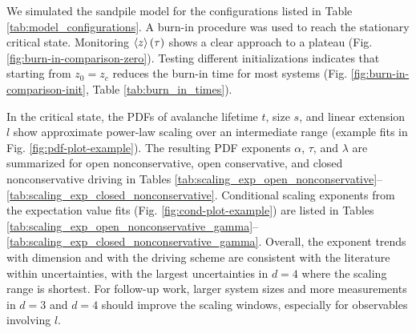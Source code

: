We simulated the sandpile model for the configurations listed in Table \ref{tab:model_configurations}. A burn-in procedure was used to reach the stationary critical state. Monitoring $\expval{z}(\tau)$ shows a clear approach to a plateau (Fig. \ref{fig:burn-in-comparison-zero}). Testing different initializations indicates that starting from $z_0=z_c$ reduces the burn-in time for most systems (Fig. \ref{fig:burn-in-comparison-init}, Table \ref{tab:burn_in_times}).

In the critical state, the PDFs of avalanche lifetime $t$, size $s$, and linear extension $l$ show approximate power-law scaling over an intermediate range (example fits in Fig. \ref{fig:pdf-plot-example}). The resulting PDF exponents $\alpha$, $\tau$, and $\lambda$ are summarized for open nonconservative, open conservative, and closed nonconservative driving in Tables \ref{tab:scaling_exp_open_nonconservative}--\ref{tab:scaling_exp_closed_nonconservative}. Conditional scaling exponents from the expectation value fits (Fig. \ref{fig:cond-plot-example}) are listed in Tables \ref{tab:scaling_exp_open_nonconservative_gamma}--\ref{tab:scaling_exp_closed_nonconservative_gamma}. Overall, the exponent trends with dimension and with the driving scheme are consistent with the literature within uncertainties, with the largest uncertainties in $d=4$ where the scaling range is shortest. For follow-up work, larger system sizes and more measurements in $d=3$ and $d=4$ should improve the scaling windows, especially for observables involving $l$.
